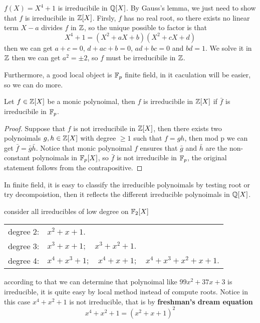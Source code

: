 \documentclass[en,geye,blue,normal,12pt]{elegantnote}
\begin{document}
\begin{example}
   \(f(X) = X^4+1\) is irreducibile in \(\mathbb{Q}[X]\). By Gauss's lemma, we just need to show that \(f\) is irreducibile in \(\mathbb{Z}[X]\). Firsly, \(f\) has no real root, so there exists no linear term \(X-a\) divides \(f\) in \(\mathbb{Z}\), so the unique possible to factor is that
   \[X^4+1 = (X^2+aX+b)(X^2+cX+d)\]
   then we can get \(a+c = 0\), \(d+ac+b=0\), \(ad+bc=0\) and \(bd=1\). We solve it in \(\mathbb{Z}\) then we can get \(a^2 = \pm 2\), so \(f\) must be irreducibile in \(\mathbb{Z}\).
\end{example}

Furthermore, a good local object is \(\mathbb{F}_p\) finite field, in it caculation will be easier, so we can do more.

\begin{proposition}
  Let \(f \in \mathbb{Z}[X]\) be a monic polynoimal, then \(f\) is irreducibile in \(\mathbb{Z}[X]\) if \(\bar{f}\) is irreducibile in \(\mathbb{F}_p\).

  \begin{proof}
    Suppose that \(f\) is not irreducibile in \(\mathbb{Z}[X]\), then there exists two polynoimals \(g,h \in \mathbb{Z}[X]\) with degree \(\geq 1\) such that \(f = gh\), then mod p we can get \(\bar{f} = \bar{g}\bar{h}\). Notice that monic polynoimal \(f\) ensures that \(\bar{g}\) and \(\bar{h}\) are the non-constant polynoimals in \(\mathbb{F}_p[X]\), so \(\bar{f}\) is not irreducible in \(\mathbb{F}_p\), the original statement follows from the contrapositive.
  \end{proof}
\end{proposition}

In finite field, it is easy to classify the irreducible polynoimals by testing root or try decompoistion, then it reflects the different irreducible polynoimals in \(\mathbb{Q}[X]\).
\begin{example}
  consider all irreducibles of low degree on \(\mathbb{F}_2[X]\)

\begin{tabular}{ll}
degree 2: & \( x^2 + x + 1. \) \\
degree 3: & \( x^3 + x + 1; \quad x^3 + x^2 + 1. \) \\
degree 4: & \( x^4 + x^3 + 1; \quad x^4 + x + 1; \quad x^4 + x^3 + x^2 + x + 1. \)
\end{tabular}

according to that we can determine that polynoimal like \(99x^2+37x+3\) is irreducible, it is quite easy by local method instead of compute roots. Notice in this case \(x^4+x^2+1\) is not irreducible, that is by \textbf{freshman's dream equation}
\[x^4+x^2+1 = (x^2+x+1)^2\]
\end{example}
\end{document}
